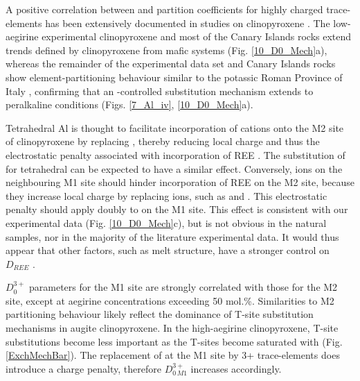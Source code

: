 \documentclass[final,authoryear,3p,times,twocolumn]{elsarticle}
\begin{document}
	A positive correlation between  and partition coefficients for highly charged trace-elements has been extensively documented in studies on clinopyroxene \citep{Lundstrom1994, Gaetani1995, Blundy1998, Francis2008, Hill2011, Mollo2016}. The low-aegirine experimental clinopyroxene and most of the Canary Islands rocks extend trends defined by clinopyroxene from mafic systems (Fig. \ref{10_D0_Mech}a), whereas the remainder of the experimental data set and Canary Islands rocks show element-partitioning behaviour similar to the potassic Roman Province of Italy \citep{Wood2001cpx, Fedele2009, Mollo2016}, confirming that an -controlled substitution mechanism extends to peralkaline conditions (Figs. \ref{7_Al_iv}, \ref{10_D0_Mech}a).
		
	Tetrahedral Al is thought to facilitate incorporation of  cations onto the M2 site of clinopyroxene by replacing , thereby reducing local charge and thus the electrostatic penalty associated with incorporation of REE \citep{Blundy1998}.
     The substitution of  for tetrahedral  can be expected to have a similar effect. Conversely,  ions on the neighbouring M1 site should hinder incorporation of REE on the M2 site, because they increase local charge by replacing  ions, such as  and . This electrostatic penalty should apply doubly to  on the M1 site. This effect is consistent with our experimental data (Fig. \ref{10_D0_Mech}c), but is not obvious in the natural samples, nor in the majority of the literature experimental data. It would thus appear that other factors, such as melt structure, have a stronger control on $D_{REE}$ \citep[e.g.][]{Prowatke2005}.


	$D_0^{3+}$ parameters for the M1 site are strongly correlated with those for the M2 site, except at aegirine concentrations exceeding 50 mol.\%. Similarities to M2 partitioning behaviour likely reflect the dominance of T-site substitution mechanisms in augite clinopyroxene. In the high-aegirine clinopyroxene, T-site substitutions become less important as the T-sites become saturated with  (Fig. \ref{ExchMechBar}). The replacement of  at the M1 site by 3+ trace-elements does introduce a charge penalty, therefore $D_{0\, M1}^{3+}$ increases accordingly.
  
\end{document}
